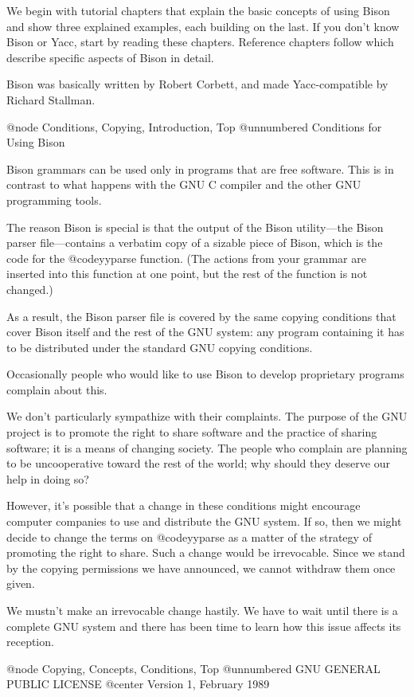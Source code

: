 We begin with tutorial chapters that explain the basic concepts of using
Bison and show three explained examples, each building on the last.  If you
don't know Bison or Yacc, start by reading these chapters.  Reference
chapters follow which describe specific aspects of Bison in detail.

Bison was basically written by Robert Corbett, and made Yacc-compatible
by Richard Stallman.

@node Conditions, Copying, Introduction, Top
@unnumbered Conditions for Using Bison

Bison grammars can be used only in programs that are free software.  This
is in contrast to what happens with the GNU C compiler and the other
GNU programming tools.

The reason Bison is special is that the output of the Bison utility---the
Bison parser file---contains a verbatim copy of a sizable piece of Bison,
which is the code for the @code{yyparse} function.  (The actions from your
grammar are inserted into this function at one point, but the rest of the
function is not changed.)

As a result, the Bison parser file is covered by the same copying
conditions that cover Bison itself and the rest of the GNU system: any
program containing it has to be distributed under the standard GNU copying
conditions.

Occasionally people who would like to use Bison to develop proprietary
programs complain about this.

We don't particularly sympathize with their complaints.  The purpose of the
GNU project is to promote the right to share software and the practice of
sharing software; it is a means of changing society.  The people who
complain are planning to be uncooperative toward the rest of the world; why
should they deserve our help in doing so?

However, it's possible that a change in these conditions might encourage
computer companies to use and distribute the GNU system.  If so, then we
might decide to change the terms on @code{yyparse} as a matter of the
strategy of promoting the right to share.  Such a change would be
irrevocable.  Since we stand by the copying permissions we have announced,
we cannot withdraw them once given.

We mustn't make an irrevocable change hastily.  We have to wait until there
is a complete GNU system and there has been time to learn how this issue
affects its reception.

@node Copying, Concepts, Conditions, Top
@unnumbered GNU GENERAL PUBLIC LICENSE
@center Version 1, February 1989

